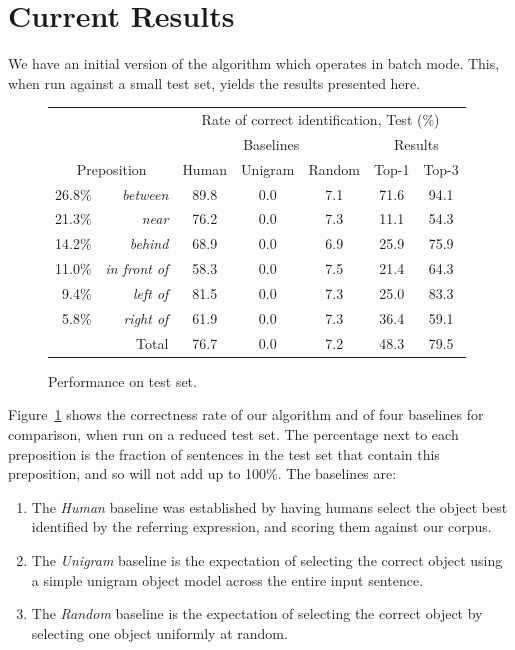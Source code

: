 \documentclass[letterpaper,10pt]{article}
\begin{document}
\section{Current Results}

We have an initial version of the algorithm which operates in batch mode. This, when run against a small test set, yields the results presented here.

\begin{figure}[H]
  \centering
  \begin{tabular}{| r r | c | c | c || c c |} \hline
     & & \multicolumn{5}{c|}{Rate of correct identification, Test (\%)} \\
     & & \multicolumn{3}{c||}{Baselines} & \multicolumn{2}{c|}{Results} \\
     \multicolumn{2}{|c|}{Preposition}
			                      &   Human & Unigram & Random &  Top-1 & Top-3 \\\hline
26.8\% & \textit{between}       & 89.8  & 0.0   & 7.1   & 71.6  & 94.1 \\
21.3\% & \textit{near}          & 76.2  & 0.0   & 7.3   & 11.1  & 54.3 \\
14.2\% & \textit{behind}        & 68.9  & 0.0   & 6.9   & 25.9  & 75.9 \\
11.0\% & \textit{in front of}   & 58.3  & 0.0   & 7.5   & 21.4  & 64.3 \\
9.4\% & \textit{left of}        & 81.5  & 0.0   & 7.3   & 25.0  & 83.3 \\
5.8\% & \textit{right of}       & 61.9  & 0.0   & 7.3   & 36.4  & 59.1 \\\hline\hline
    \multicolumn{2}{|r|}{Total} & 76.7  & 0.0   & 7.2   & 48.3  & 79.5 \\\hline
  \end{tabular}
  \caption{Performance on test set.}
  \label{fig:results}
\end{figure}

Figure~\ref{fig:results} shows the correctness rate of our algorithm and of four baselines for comparison, when run on a reduced test set. The percentage next to each preposition is the fraction of sentences in the test set that contain this preposition, and so will not add up to 100\%. The baselines are:
\begin{enumerate}[topsep=0pt,itemsep=-1ex,partopsep=1ex,parsep=1ex]
	\item The \emph{Human} baseline was established by having humans select the object best identified by the referring expression, and scoring them against our corpus.
	\item The \emph{Unigram} baseline is the expectation of selecting the correct object using a simple unigram object model across the entire input sentence.
	\item The \emph{Random} baseline is the expectation of selecting the correct object by selecting one object uniformly at random.
\end{enumerate}
\end{document}
